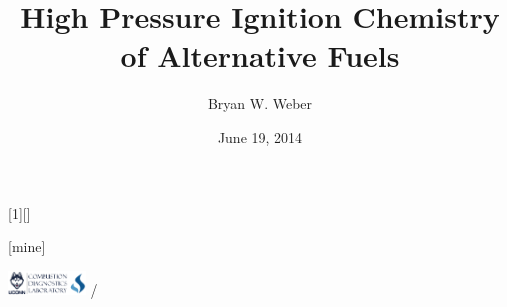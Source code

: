 \title{High Pressure Ignition Chemistry of Alternative Fuels}
\author{Bryan W. Weber}
\date{June 19, 2014}

\usepackage{lmodern}

\AtBeginSection{\frame{\sectionpage}}

[1][]{%
}
[mine]

\usepackage{pgfplots}
\usetikzlibrary{decorations.pathreplacing,calc,decorations.text}

\newcommand{\arcarrow}[9]%
{   \pgfmathsetmacro{\rin}{#1}
    \pgfmathsetmacro{\rmid}{#2}
    \pgfmathsetmacro{\rout}{#3}
    \pgfmathsetmacro{\astart}{#4}
    \pgfmathsetmacro{\aend}{#5}
    \pgfmathsetmacro{\atip}{#6}
    \fill[#7] (\astart:\rin) arc (\astart:\aend:\rin) -- (\aend+\atip:\rmid) -- (\aend:\rout) arc (\aend:\astart:\rout) -- (\astart+\atip:\rmid) -- cycle;
    \path[decoration={text along path, text={#8}, text color={#9}, text align={align=center}, raise=-0.5ex},decorate] (\astart+\atip:\rmid) arc (\astart+\atip:\aend+\atip:\rmid);
}

\newcommand{\tikzmark}[1]{\tikz[overlay,remember picture] \coordinate (#1);}

\beamertemplatenavigationsymbolsempty

{%
\begin{beamercolorbox}[sep=2mm]{}
\includegraphics[height=0.25in]{logo}
\hfill
{\color{gray} \insertpagenumber{}/\insertpresentationendpage}
\end{beamercolorbox}
}%

\graphicspath{ {figures/} }

\usepackage[absolute,overlay]{textpos}

\usepackage{siunitx}

